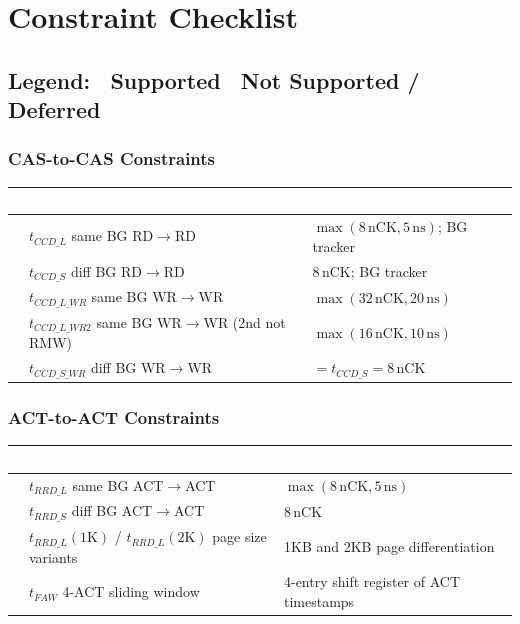 \documentclass[11pt,a4paper]{article}
\newcommand{\THead}[1]{\cellcolor{navy}\textcolor{white}{\small\textbf{#1}}}
\newcommand{\RA}{\rowcolor{lgray}}
\newcommand{\RB}{\rowcolor{sky!30}}
\newcommand{\cmark}{\textcolor{grn}{\ding{51}}}
\newcommand{\xmark}{\textcolor{red}{\ding{55}}}
\begin{document}
\section{Constraint Checklist}

\subsection*{Legend: \cmark\ Supported \quad \xmark\ Not Supported / Deferred}

\subsubsection*{CAS-to-CAS Constraints}
\begin{center}
\begin{tabularx}{\linewidth}{@{} c l X @{}}
\toprule
\THead{} & \THead{Constraint} & \THead{Notes} \\
\midrule
\RA\cmark & $t_{CCD\_L}$ same BG RD$\to$RD &
  $\max(8\,\text{nCK},5\,\text{ns})$; BG tracker \\
\RB\cmark & $t_{CCD\_S}$ diff BG RD$\to$RD &
  8\,nCK; BG tracker \\
\RA\cmark & $t_{CCD\_L\_WR}$ same BG WR$\to$WR &
  $\max(32\,\text{nCK},20\,\text{ns})$ \\
\RB\cmark & $t_{CCD\_L\_WR2}$ same BG WR$\to$WR (2nd not RMW) &
  $\max(16\,\text{nCK},10\,\text{ns})$ \\
\RA\cmark & $t_{CCD\_S\_WR}$ diff BG WR$\to$WR &
  $= t_{CCD\_S} = 8\,\text{nCK}$ \\
\bottomrule
\end{tabularx}
\end{center}

\subsubsection*{ACT-to-ACT Constraints}
\begin{center}
\begin{tabularx}{\linewidth}{@{} c l X @{}}
\toprule
\THead{} & \THead{Constraint} & \THead{Notes} \\
\midrule
\RA\cmark & $t_{RRD\_L}$ same BG ACT$\to$ACT &
  $\max(8\,\text{nCK},5\,\text{ns})$ \\
\RB\cmark & $t_{RRD\_S}$ diff BG ACT$\to$ACT &
  8\,nCK \\
\RA\cmark & $t_{RRD\_L}(1\text{K})$ / $t_{RRD\_L}(2\text{K})$ page size variants &
  1KB and 2KB page differentiation \\
\RB\cmark & $t_{FAW}$ 4-ACT sliding window &
  4-entry shift register of ACT timestamps \\
\bottomrule
\end{tabularx}
\end{center}
\end{document}
